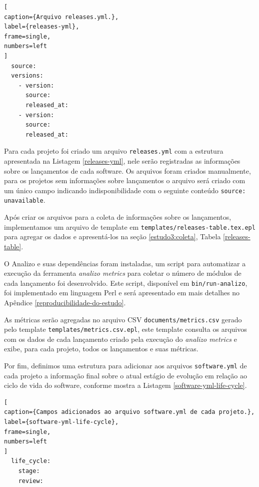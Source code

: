 \begin{lstlisting}[
caption={Arquivo releases.yml.},
label={releases-yml},
frame=single,
numbers=left
]
  source:
  versions:
    - version:
      source:
      released_at:
    - version:
      source:
      released_at:
\end{lstlisting}

Para cada projeto foi criado um arquivo \texttt{releases.yml} com a estrutura
apresentada na Listagem \ref{releases-yml}, nele serão registradas as
informações sobre os lançamentos de cada software. Os arquivos foram criados
manualmente, para os projetos sem informações sobre lançamentos o arquivo será
criado com um único campo indicando indisponibilidade com o seguinte conteúdo
\texttt{source: unavailable}.

Após criar os arquivos para a coleta de informações sobre os lançamentos,
implementamos um arquivo de template em
\texttt{templates/releases-table.tex.epl} para agregar os dados e apresentá-los
na seção \ref{estudo3:coleta}, Tabela \ref{releases-table}.


O Analizo e suas dependências foram instaladas, um script para automatizar a
execução da ferramenta {\it analizo metrics} para coletar o número de módulos
de cada lançamento foi desenvolvido. Este script, disponível em
\texttt{bin/run-analizo}, foi implementado em linguagem Perl e será apresentado
em mais detalhes no Apêndice \ref{reproducibilidade-do-estudo}.


As métricas serão agregadas no arquivo CSV \texttt{documents/metrics.csv}
gerado pelo template \texttt{templates/metrics.csv.epl}, este template consulta
os arquivos com os dados de cada lançamento criado pela execução do {\it analizo metrics}
e exibe, para cada projeto, todos os lançamentos e suas métricas.

Por fim, definimos uma estrutura para adicionar aos arquivos \texttt{software.yml} de
cada projeto a informação final sobre o atual estágio de evolução em relação ao
ciclo de vida do software, conforme mostra a Listagem \ref{software-yml-life-cycle}.

\begin{lstlisting}[
caption={Campos adicionados ao arquivo software.yml de cada projeto.},
label={software-yml-life-cycle},
frame=single,
numbers=left
]
  life_cycle:
    stage:
    review:
\end{lstlisting}

